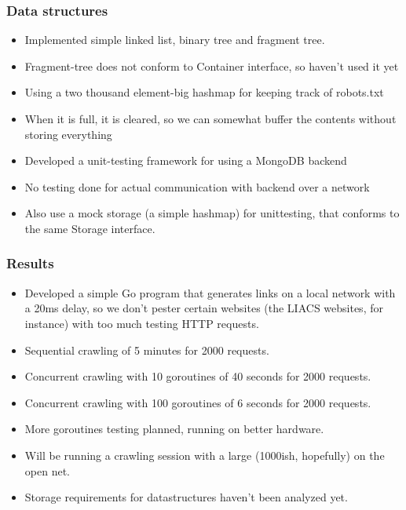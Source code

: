 \documentclass[ignorenonframetext,]{beamer}
\begin{document}
\begin{frame}\frametitle{Data structures}

\begin{itemize}
\item
  Implemented simple linked list, binary tree and fragment tree.
\item
  Fragment-tree does not conform to Container interface, so haven't used
  it yet
\item
  Using a two thousand element-big hashmap for keeping track of
  robots.txt
\item
  When it is full, it is cleared, so we can somewhat buffer the contents
  without storing everything
\item
  Developed a unit-testing framework for using a MongoDB backend
\item
  No testing done for actual communication with backend over a network
\item
  Also use a mock storage (a simple hashmap) for unittesting, that
  conforms to the same Storage interface.
\end{itemize}
\end{frame}

\begin{frame}\frametitle{Results}

\begin{itemize}
\item
  Developed a simple Go program that generates links on a local network
  with a 20ms delay, so we don't pester certain websites (the LIACS
  websites, for instance) with too much testing HTTP requests.
\item
  Sequential crawling of 5 minutes for 2000 requests.
\item
  Concurrent crawling with 10 goroutines of 40 seconds for 2000
  requests.
\item
  Concurrent crawling with 100 goroutines of 6 seconds for 2000
  requests.
\item
  More goroutines testing planned, running on better hardware.
\item
  Will be running a crawling session with a large (1000ish, hopefully)
  on the open net.
\item
  Storage requirements for datastructures haven't been analyzed yet.
\end{itemize}
\end{frame}
\end{document}

